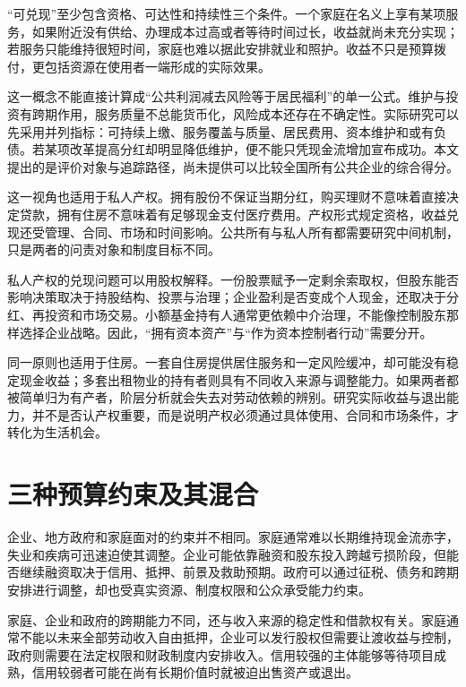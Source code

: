 \documentclass[UTF8,fontset=fandol,zihao=-4,oneside,openany]{ctexbook}
\begin{document}
\label{arg:P026}
“可兑现”至少包含资格、可达性和持续性三个条件。一个家庭在名义上享有某项服务，如果附近没有供给、办理成本过高或者等待时间过长，收益就尚未充分实现；若服务只能维持很短时间，家庭也难以据此安排就业和照护。收益不只是预算拨付，更包括资源在使用者一端形成的实际效果。

这一概念不能直接计算成“公共利润减去风险等于居民福利”的单一公式。维护与投资有跨期作用，服务质量不总能货币化，风险成本还存在不确定性。实际研究可以先采用并列指标：可持续上缴、服务覆盖与质量、居民费用、资本维护和或有负债。若某项改革提高分红却明显降低维护，便不能只凭现金流增加宣布成功。本文提出的是评价对象与追踪路径，尚未提供可以比较全国所有公共企业的综合得分。

这一视角也适用于私人产权。拥有股份不保证当期分红，购买理财不意味着直接决定贷款，拥有住房不意味着有足够现金支付医疗费用。产权形式规定资格，收益兑现还受管理、合同、市场和时间影响。公共所有与私人所有都需要研究中间机制，只是两者的问责对象和制度目标不同。

\label{arg:P027}
私人产权的兑现问题可以用股权解释。一份股票赋予一定剩余索取权，但股东能否影响决策取决于持股结构、投票与治理；企业盈利是否变成个人现金，还取决于分红、再投资和市场交易。小额基金持有人通常更依赖中介治理，不能像控制股东那样选择企业战略。因此，“拥有资本资产”与“作为资本控制者行动”需要分开。

同一原则也适用于住房。一套自住房提供居住服务和一定风险缓冲，却可能没有稳定现金收益；多套出租物业的持有者则具有不同收入来源与调整能力。如果两者都被简单归为有产者，阶层分析就会失去对劳动依赖的辨别。研究实际收益与退出能力，并不是否认产权重要，而是说明产权必须通过具体使用、合同和市场条件，才转化为生活机会。

\section{三种预算约束及其混合}
企业、地方政府和家庭面对的约束并不相同。家庭通常难以长期维持现金流赤字，失业和疾病可迅速迫使其调整。企业可能依靠融资和股东投入跨越亏损阶段，但能否继续融资取决于信用、抵押、前景及救助预期。政府可以通过征税、债务和跨期安排进行调整，却也受真实资源、制度权限和公众承受能力约束。

\label{arg:P028}
家庭、企业和政府的跨期能力不同，还与收入来源的稳定性和借款权有关。家庭通常不能以未来全部劳动收入自由抵押，企业可以发行股权但需要让渡收益与控制，政府则需要在法定权限和财政制度内安排收入。信用较强的主体能够等待项目成熟，信用较弱者可能在尚有长期价值时就被迫出售资产或退出。
\end{document}

